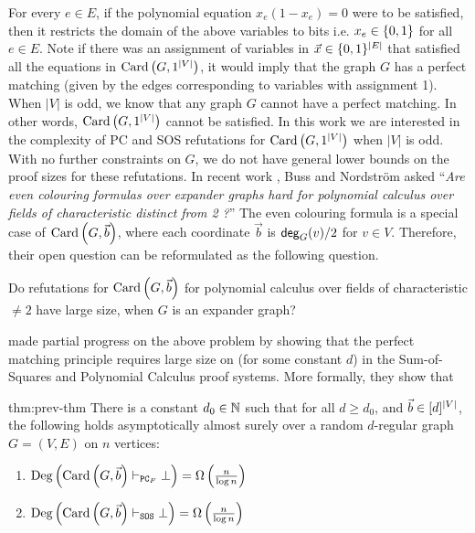 \documentclass[11pt]{article}
\newcommand{\Degree}[1]{\text{Deg}\left(#1\right)}
\newcommand{\PC}{\vdash_{\texttt{PC}_F}}
\newcommand{\SOS}{\vdash_{\texttt{SOS}}}
\begin{document}
For every $e \in E$, if the polynomial equation $x_e(1 - x_e) = 0$ were to be satisfied, then it restricts the domain of the above variables to bits i.e. $x_e \in \{0,1\}$ for all $e \in E$.
Note if there was an assignment of variables in $\vec{x} \in \{0,1\}^{|E|}$ that satisfied all the equations in $\text{Card}\left(G, 1^{|V|}\right)$, it would imply that the graph $G$ has a perfect matching (given by the edges corresponding to variables with assignment 1).  
When $|V|$ is odd, we know that any graph $G$ cannot have a perfect matching.
In other words, $\text{Card}\left(G, 1^{|V|}\right)$ cannot be satisfied.
In this work we are interested in the complexity of PC and SOS refutations for $\text{Card}\left(G, 1^{|V|}\right)$  when $|V|$ is odd.
With no further constraints on $G$, we do not have general lower bounds on the proof sizes for these refutations.
In recent work \citep[Open Problem 7.7]{buss2021proof}, Buss and Nordstr{\"o}m asked ``\textit{Are even colouring formulas over expander graphs hard for
polynomial calculus over fields of characteristic distinct from 2 ?}''
The even colouring formula is a special case of $\text{Card}\left(G, \vec{b}\right)$, where each coordinate  $\vec{b}$ is $\mathsf{deg}_{G}(v)/2$ for $v \in V$.
Therefore, their open question can be reformulated as the following question.

\begin{boxedproblem}\citep[Open Problem 7.7]{buss2021proof}
Do refutations for $\text{Card}\left(G, \vec{b}\right)$ for
polynomial calculus over fields of characteristic $\neq 2$ have large size, when $G$ is an expander graph?
\end{boxedproblem}

\citet{Austrin_2022} made partial progress on the above problem by showing that the perfect matching principle requires large size on  (for some constant $d$) in the Sum-of-Squares and Polynomial Calculus proof systems.
More formally, they show that 

\begin{theorem}{\citep{Austrin_2022}}{thm:prev-thm}
There is a constant $d_0 \in \mathbb{N}$ such that for all $d \geq d_0$, and $\vec{b} \in [d]^{\left|V\right|}$, the following holds asymptotically almost surely over a random $d$-regular graph $G=(V,E)$ on $n$ vertices:
\begin{enumerate}
    \item{ $\Degree{\Card{G, \vec{b}} \PC \bot} = \BigOmega{\frac{n}{\log n}}$} 
    \item{$\Degree{\Card{G, \vec{b}} \SOS \bot} = \BigOmega{\frac{n}{\log n}}$}
\end{enumerate}
\end{theorem}
\end{document}
